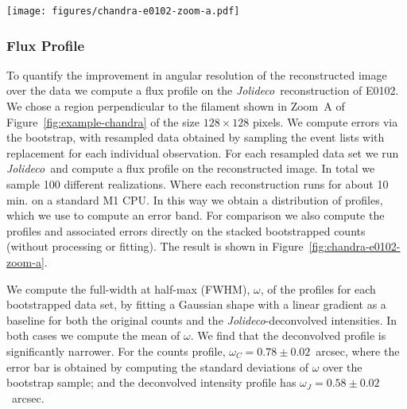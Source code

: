 \documentclass[twocolumn]{aastex631}
\newcommand{\jolideco}{\textit{Jolideco}~}
\newcommand{\jolideconospace}{\textit{Jolideco}}
\newcommand{\dvd}[1]{{\color{red} [DvD: #1]}}
\begin{document}
    \begin{figure*}
        \begin{centering}
            \texttt{[image: figures/chandra-e0102-zoom-a.pdf]}
            \caption{
                The left panel shows the deconvolved flux and counts profile of the region illustrated in the right panel. The associated $3\sigma$ error band is shown transparent in the background. Both profiles are normalized such that they integrate to unity and are aligned such that the position of their peak coincides.
                \dvd{I must not understand what you are doing here. Why is the \jolideco result so smooth? Isn't this based on the bootstrap? There should be MC error. Also what is the $3\sigma$ error band? The histogram of the bootstrap resampled values represents the uncertainty.}
            }
            \label{fig:chandra-e0102-zoom-a}
        \end{centering}
    \end{figure*}
    
    \subsubsection{Flux Profile}
    To quantify the improvement in angular resolution of the reconstructed image over the data we compute a flux profile on the \jolideco reconstruction of E0102. We chose a region perpendicular to the filament shown in Zoom~A of Figure~\ref{fig:example-chandra} of the size $128\times128$ pixels. We compute errors via the bootstrap, with resampled data obtained by sampling the event lists with replacement for each individual observation. For each resampled data set we run \jolideco and compute a flux profile on the reconstructed image. In total we sample 100 different realizations. Where each reconstruction runs for about 10 min. on a standard M1 CPU. In this way we obtain a distribution of profiles, which we use to compute an error band. For comparison we also compute the profiles and associated errors directly on the stacked bootstrapped counts (without processing or fitting). The result is shown in Figure~\ref{fig:chandra-e0102-zoom-a}.

    We compute the full-width at half-max (FWHM), $\omega$, of the profiles for each bootstrapped data set, by fitting a Gaussian shape with a linear gradient as a baseline for both the original counts and the \jolideconospace-deconvolved intensities. In both cases we compute the mean of $\omega$. We find that the deconvolved profile is significantly narrower. For the counts profile, $\omega_C=0.78 \pm 0.02$~arcsec, where the error bar is obtained by computing the standard deviations of $\omega$ over the bootstrap sample; and the deconvolved intensity profile has $\omega_J=0.58 \pm 0.02$~arcsec.
\end{document}
